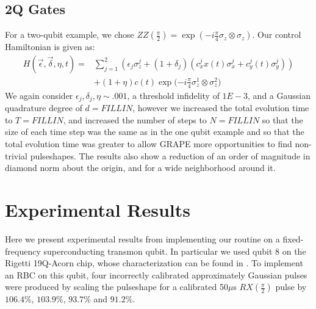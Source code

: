 \documentclass[aps,nofootinbib,pra,notitlepage,twocolumn]{revtex4-1}
\begin{document}
\subsection{2Q Gates}\label{2Q Gates}
 For a two-qubit example, we chose $ZZ(\frac{\pi}{2})=\exp{(-i\frac{\pi}{4}\sigma_z\otimes\sigma_z)}$. Our control Hamiltonian is given as:
\begin{equation} \label{eq:2Qham}
\begin{split}
H(\vec{\epsilon}, \vec{\delta}, \eta, t) = &\sum_{j=1}^2(\epsilon_j\sigma_z^j + (1 + \delta_j)(c_x^jx(t)\sigma_x^j + c_y^j(t)\sigma_y^j)) \\
&+ (1+\eta)c(t) \exp{(-i\frac{\pi}{4}\sigma_z^1\otimes\sigma_z^2})
\end{split}
\end{equation}
We again consider $\epsilon_j, \delta_j, \eta \sim .001$, a threshold infidelity of $1E-3$, and a Gaussian quadrature degree of $d=FILL IN$, however we increased the total evolution time to $T=FILL IN$, and increased the number of steps to $N=FILL IN$ so that the size of each time step was the same as in the one qubit example and so that the total evolution time was greater to allow GRAPE more opportunities to find non-trivial pulseshapes. The results also show a reduction of an order of magnitude in diamond norm about the origin, and for a wide neighborhood around it.

\section{Experimental Results}\label{experimental}
Here we present experimental results from implementing our routine on a fixed-frequency superconducting transmon qubit. In particular we used qubit 8 on the Rigetti 19Q-Acorn chip, whose characterization can be found in \cite{1712.05771}. To implement an RBC on this qubit, four incorrectly calibrated approximately Gaussian pulses were produced by scaling the pulseshape for a calibrated 50$\mu$s $RX(\frac{\pi}{2})$ pulse by $106.4\%$,  $103.9\%$, $93.7\%$ and $91.2\%$.
\end{document}
